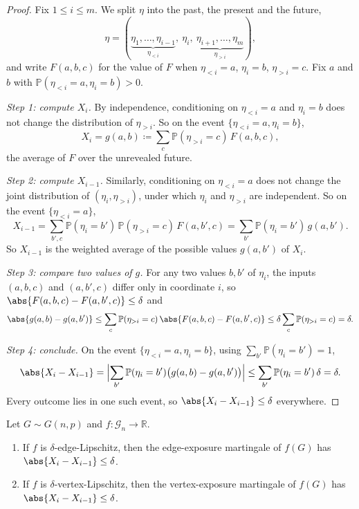 \begin{proof}
    Fix \(1 \le i \le m\). We split \(\eta\) into the past, the present and the future,
    \[
        \eta = (\underbrace{\eta_{1}, \ldots, \eta_{i-1}}_{\eta_{< i}}, \ \eta_{i}, \ \underbrace{\eta_{i+1}, \ldots, \eta_{m}}_{\eta_{> i}}) ,
    \]
    and write \(F(a, b, c)\) for the value of \(F\) when \(\eta_{< i} = a\), \(\eta_{i} = b\), \(\eta_{> i} = c\). Fix \(a\) and \(b\) with \(\mathbb{P}(\eta_{< i} = a, \eta_{i} = b) > 0\).

    \emph{Step 1: compute \(X_{i}\).} By independence, conditioning on \(\eta_{< i} = a\) and \(\eta_{i} = b\) does not change the distribution of \(\eta_{> i}\). So on the event \(\{ \eta_{< i} = a, \eta_{i} = b \}\),
    \[
        X_{i} = g(a, b) \coloneqq \sum_{c} \mathbb{P}(\eta_{> i} = c) \, F(a, b, c) ,
    \]
    the average of \(F\) over the unrevealed future.

    \emph{Step 2: compute \(X_{i-1}\).} Similarly, conditioning on \(\eta_{< i} = a\) does not change the joint distribution of \((\eta_{i}, \eta_{> i})\), under which \(\eta_{i}\) and \(\eta_{> i}\) are independent. So on the event \(\{ \eta_{< i} = a \}\),
    \[
        X_{i-1}
        = \sum_{b', c} \mathbb{P}(\eta_{i} = b') \, \mathbb{P}(\eta_{> i} = c) \, F(a, b', c)
        = \sum_{b'} \mathbb{P}(\eta_{i} = b') \, g(a, b') .
    \]
    So \(X_{i-1}\) is the weighted average of the possible values \(g(a, b')\) of \(X_{i}\).

    \emph{Step 3: compare two values of \(g\).} For any two values \(b, b'\) of \(\eta_{i}\), the inputs \((a, b, c)\) and \((a, b', c)\) differ only in coordinate \(i\), so \(\abs{F(a, b, c) - F(a, b', c)} \le \delta\) and
    \[
        \abs{g(a, b) - g(a, b')}
        \le \sum_{c} \mathbb{P}(\eta_{> i} = c) \, \abs{F(a, b, c) - F(a, b', c)}
        \le \delta \sum_{c} \mathbb{P}(\eta_{> i} = c)
        = \delta .
    \]

    \emph{Step 4: conclude.} On the event \(\{ \eta_{< i} = a, \eta_{i} = b \}\), using \(\sum_{b'} \mathbb{P}(\eta_{i} = b') = 1\),
    \[
        \abs{X_{i} - X_{i-1}}
        = \Bigl| \sum_{b'} \mathbb{P}(\eta_{i} = b') \bigl( g(a, b) - g(a, b') \bigr) \Bigr|
        \le \sum_{b'} \mathbb{P}(\eta_{i} = b') \, \delta
        = \delta .
    \]
    Every outcome lies in one such event, so \(\abs{X_{i} - X_{i-1}} \le \delta\) everywhere.
\end{proof}

\begin{fact}\label{fact:lipschitz-martingale}
    Let \(G \sim G(n, p)\) and \(f \colon \mathcal{G}_{n} \to \mathbb{R}\).
    \begin{enumerate}[(1)]
        \item If \(f\) is \(\delta\)-edge-Lipschitz, then the edge-exposure martingale of \(f(G)\) has \(\abs{X_{i} - X_{i-1}} \le \delta\).
        \item If \(f\) is \(\delta\)-vertex-Lipschitz, then the vertex-exposure martingale of \(f(G)\) has
        \(\abs{X_{i} - X_{i-1}} \le \delta\).
    \end{enumerate}
\end{fact}

